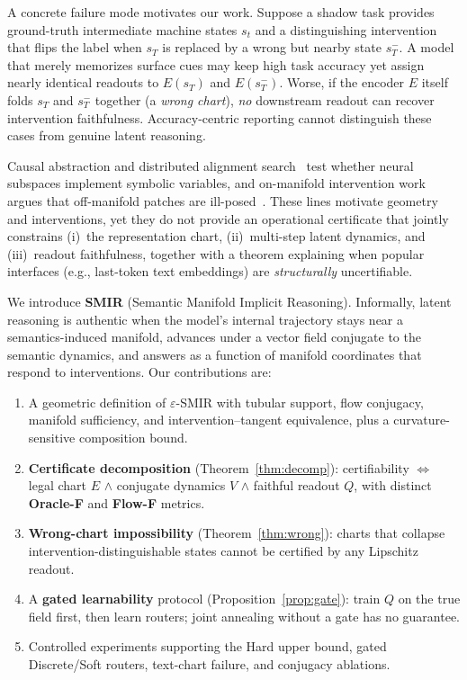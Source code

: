 \documentclass[letterpaper,10pt,twocolumn]{article}
\theoremstyle{definition}
\begin{document}
A concrete failure mode motivates our work.
Suppose a shadow task provides ground-truth intermediate machine states $s_t$ and a distinguishing intervention that flips the label when $s_T$ is replaced by a wrong but nearby state $s_T^-$.
A model that merely memorizes surface cues may keep high task accuracy yet assign nearly identical readouts to $E(s_T)$ and $E(s_T^-)$.
Worse, if the encoder $E$ itself folds $s_T$ and $s_T^-$ together (a \emph{wrong chart}), \emph{no} downstream readout can recover intervention faithfulness.
Accuracy-centric reporting cannot distinguish these cases from genuine latent reasoning.

Causal abstraction and distributed alignment search~\citep{geiger2021causal,geiger2024das} test whether neural subspaces implement symbolic variables, and on-manifold intervention work argues that off-manifold patches are ill-posed~\citep{onmanifold2025}.
These lines motivate geometry and interventions, yet they do not provide an operational certificate that jointly constrains (i)~the representation chart, (ii)~multi-step latent dynamics, and (iii)~readout faithfulness, together with a theorem explaining when popular interfaces (e.g., last-token text embeddings) are \emph{structurally} uncertifiable.

We introduce \textbf{SMIR} (Semantic Manifold Implicit Reasoning).
Informally, latent reasoning is authentic when the model's internal trajectory stays near a semantics-induced manifold, advances under a vector field conjugate to the semantic dynamics, and answers as a function of manifold coordinates that respond to interventions.
Our contributions are:
\begin{enumerate}[leftmargin=*]
\item A geometric definition of $\varepsilon$-SMIR with tubular support, flow conjugacy, manifold sufficiency, and intervention--tangent equivalence, plus a curvature-sensitive composition bound.
\item \textbf{Certificate decomposition} (Theorem~\ref{thm:decomp}): certifiability $\Leftrightarrow$ legal chart $E$ $\wedge$ conjugate dynamics $V$ $\wedge$ faithful readout $Q$, with distinct \textbf{Oracle-F} and \textbf{Flow-F} metrics.
\item \textbf{Wrong-chart impossibility} (Theorem~\ref{thm:wrong}): charts that collapse intervention-distinguishable states cannot be certified by any Lipschitz readout.
\item A \textbf{gated learnability} protocol (Proposition~\ref{prop:gate}): train $Q$ on the true field first, then learn routers; joint annealing without a gate has no guarantee.
\item Controlled experiments supporting the Hard upper bound, gated Discrete/Soft routers, text-chart failure, and conjugacy ablations.
\end{enumerate}
\end{document}
